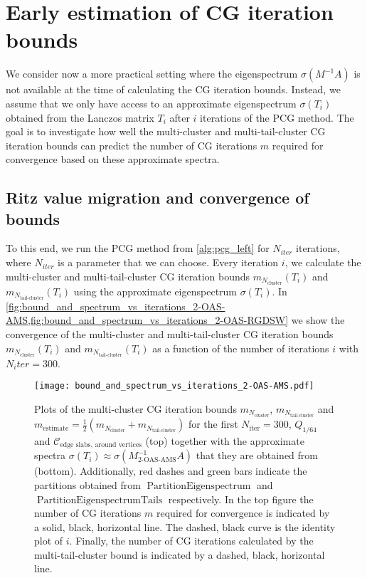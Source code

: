 \section{Early estimation of CG iteration bounds}\label{sec:early_estimation_of_iterations}
We consider now a more practical setting where the eigenspectrum $\sigma(M^{-1}A)$ is not available at the time of calculating the CG iteration bounds. Instead, we assume that we only have access to an approximate eigenspectrum $\sigma(T_i)$ obtained from the Lanczos matrix $T_i$ after $i$ iterations of the PCG method. The goal is to investigate how well the multi-cluster and multi-tail-cluster CG iteration bounds can predict the number of CG iterations $m$ required for convergence based on these approximate spectra.

\subsection{Ritz value migration and convergence of bounds}\label{sec:ritz_value_migration}
To this end, we run the PCG method from \cref{alg:pcg_left} for $N_{iter}$ iterations, where $N_{iter}$ is a parameter that we can choose. Every iteration $i$, we calculate the multi-cluster and multi-tail-cluster CG iteration bounds $m_{N_{\text{cluster}}}(T_i)$ and $m_{N_{\text{tail-cluster}}}(T_i)$ using the approximate eigenspectrum $\sigma(T_i)$. In \cref{fig:bound_and_spectrum_vs_iterations_2-OAS-AMS,fig:bound_and_spectrum_vs_iterations_2-OAS-RGDSW} we show the convergence of the multi-cluster and multi-tail-cluster CG iteration bounds $m_{N_{\text{cluster}}}(T_i)$ and $m_{N_{\text{tail-cluster}}}(T_i)$ as a function of the number of iterations $i$ with $N_iter=300$.
\begin{figure}[H]
    \centering
    \texttt{[image: bound\_and\_spectrum\_vs\_iterations\_2-OAS-AMS.pdf]}
    \caption{Plots of the multi-cluster CG iteration bounds $m_{N_{\text{cluster}}}$, $m_{N_{\text{tail-cluster}}}$ and $m_{\text{estimate}} = \frac{1}{2}(m_{N_{\text{cluster}}} + m_{N_{\text{tail-cluster}}})$ for the first $N_{\text{iter}}=300$, $Q_{1/64}$ and $\mathcal{C}_{\text{edge slabs, around vertices}}$ (top) together with the approximate spectra $\sigma(T_i) \approx \sigma(M^{-1}_{\text{2-OAS-AMS}}A)$ that they are obtained from (bottom). Additionally, red dashes and green bars indicate the partitions obtained from $\operatorname{PartitionEigenspectrum}$ and $\operatorname{PartitionEigenspectrumTails}$ respectively. In the top figure the number of CG iterations $m$ required for convergence is indicated by a solid, black, horizontal line. The dashed, black curve is the identity plot of $i$. Finally, the number of CG iterations calculated by the multi-tail-cluster bound is indicated by a dashed, black, horizontal line.}
    \label{fig:bound_and_spectrum_vs_iterations_2-OAS-AMS}
\end{figure}
